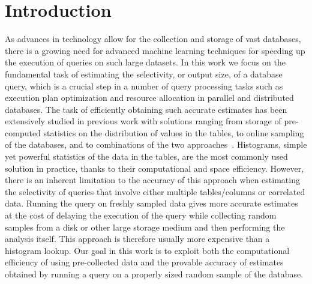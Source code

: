 \section{Introduction}\label{sec:intro}
As advances in technology allow for the collection and storage of vast
databases, there is a growing need for advanced machine learning techniques for
speeding up the execution of queries on such large datasets. In this work we
focus on the fundamental task of estimating the selectivity, or output size, of
a database query, which is a crucial step in a number of query processing tasks
such as execution plan optimization and resource allocation in parallel and
distributed databases. The task of efficiently obtaining such accurate estimates
has been extensively studied in previous work with solutions ranging from
storage of pre-computed statistics on the distribution of values in the tables,
to online sampling of the databases, and to combinations of the two
approaches~\citep{LiptonN95,LiptonNS90,HaasS92,HouOD91,HaasS95,GangulyGMS96,GantiLR00,GibbonsM98,HouOT88,LarsonLZZ07,PoosalaI97}.
Histograms, simple yet powerful statistics of the data in the tables, are the most
commonly used solution in practice, thanks to their computational and space
efficiency. However, there is an inherent limitation to the accuracy of this
approach when estimating the selectivity of queries that involve either multiple
tables/columns or correlated data. Running the query on freshly sampled data
gives more accurate estimates at the cost of delaying the execution of the query
while collecting random samples from a disk or other large storage medium and
then performing the analysis itself. This approach is therefore usually more
expensive than a histogram lookup. Our goal in this work is to exploit both the
computational efficiency of using pre-collected data and the provable accuracy
of estimates obtained by running a query on a properly sized random sample of
the database.

